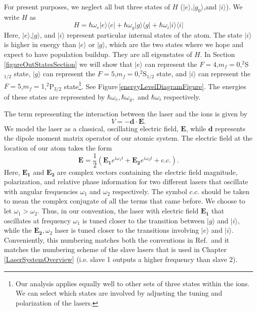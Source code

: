 For present purposes, we neglect all but three states of $H$ ($|e\rangle$,$|g_0\rangle$,and $|i\rangle$). We write $H$ as 
\begin{equation}
H=
\hbar\omega_e |e\rangle\langle e | +
\hbar\omega_g |g\rangle\langle g | +
\hbar\omega_i |i\rangle\langle i | 
\end{equation}
Here, $|e\rangle$,$|g\rangle$, and $|i\rangle$ represent particular internal states of the atom. The state $|i\rangle$ is higher in energy than $|e\rangle$ or $|g\rangle$, which are the two states where we hope and expect to have population buildup. They are all eigenstates of $H$. In Section\,\ref{figureOutStatesSection} we will show that $|e\rangle$ can represent the $F=4$,$m_f=0$,$^2$S$_{1/2}$ state, $|g\rangle$ can represent the $F=5$,$m_f=0$,$^2$S$_{1/2}$ state, and $|i\rangle$ can represent the $F=5$,$m_f=1$,$^2$P$_{3/2}$ state\footnote{Our analysis applies equally well to other sets of three states within the ions. We can select which states are involved by adjusting the tuning and polarization of the lasers.}. See Figure\,\ref{energyLevelDiagramFigure}. The energies of these states are represented by $\hbar\omega_e,\hbar\omega_g,$ and $\hbar\omega_i$ respectively. 

The term representing the interaction between the laser and the ions is given by
\begin{equation}
V=-\mathbf{d}\cdot\mathbf{E}.
\end{equation}
We model the laser as a classical, oscillating electric field, $\mathbf{E}$, while $\mathbf{d}$ represents the dipole moment matrix operator of our atomic system. The electric field at the location of our atom takes the form 
\begin{equation}
\mathbf{E}=\frac{1}{2}\left(\mathbf{E_1} e^{i\omega_1 t} + \mathbf{E_2} e^{i\omega_2 t} + c.c. \right). \label{eqn:Efield}
\end{equation}
Here, $\mathbf{E_1}$ and $\mathbf{E_2}$ are complex vectors containing the electric field magnitude, polarization, and relative phase information for two different lasers that oscillate with angular frequencies $\omega_1$ and $\omega_2$ respectively. The symbol $c.c.$ should be taken to mean the complex conjugate of all the terms that came before. We choose to let $\omega_1>\omega_2$. 
Thus, in our convention, the laser with electric field $\mathbf{E_1}$ that oscillates at frequency $\omega_1$ is tuned closer to the transition between $|g\rangle$ and $|i\rangle$, while the $\mathbf{E_2}, \omega_2$ laser is tuned closer to the transitions involving $|e\rangle$ and $|i\rangle$. Conveniently, this numbering matches both the conventions in Ref.\,\cite{Young1997363} and it matches the numbering scheme of the slave lasers that is used in Chapter\,\ref{LaserSystemOverview} (i.e. slave 1 outputs a higher frequency than slave 2). 

